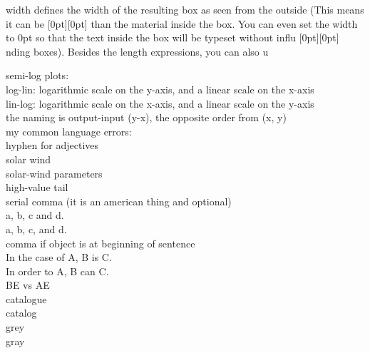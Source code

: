 width defines the width of the resulting box as seen from the outside (This means it can be \raisebox{0pt}[0pt][0pt]{} than the material inside the box. You can even set the width to 0pt so that the text inside the box will be typeset without influ%
\raisebox{0pt}[0pt][0pt]{%
\raisebox{-0.1ex}{en}%
\raisebox{-0.3ex}{c}%
\raisebox{-0.6ex}{i}%
\raisebox{-1.0ex}{n}%
\raisebox{-1.5ex}{g}%
\raisebox{-2.1ex}{ }%
\raisebox{-2.8ex}{t}%
\raisebox{-3.6ex}{h}%
\raisebox{-4.5ex}{e}%
\raisebox{-2ex}{ }%
\raisebox{2.8ex}{s}%
\raisebox{2.2ex}{u}%
\raisebox{1.8ex}{r}%
\raisebox{1.2ex}{r}%
\raisebox{0.8ex}{o}%
\raisebox{0.3ex}{u}}%
nding boxes). Besides the length expressions, you can also u


semi-log plots:\\
log-lin:	logarithmic scale on the y-axis, and a linear scale on the x-axis\\
lin-log:	logarithmic scale on the x-axis, and a linear scale on the y-axis\\
the naming is output-input (y-x), the opposite order from (x, y)\\


my common language errors:\\
hyphen for adjectives\\
solar wind\\
solar-wind parameters\\
high-value tail\\

serial comma (it is an american thing and optional)\\
a, b, c and d.\\
a, b, c, and d.\\

comma if object is at beginning of sentence\\
In the case of A, B is C.\\
In order to A, B can C.\\

BE vs AE\\
catalogue\\
catalog\\

grey\\
gray\\




